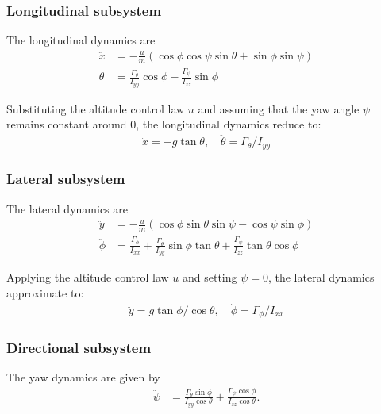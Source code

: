 \documentclass[conference]{IEEEtran}
\begin{document}
\subsubsection{Longitudinal subsystem}
The longitudinal dynamics are
%
\begin{align}
\ddot x &= -\frac{u}{m} \left( \cos \phi \cos \psi \sin \theta + \sin \phi \sin \psi \right) \label{long_dynamics_x} \\
\ddot \theta &= \frac{\Gamma_\theta} {I_{yy}} \cos \phi -\frac{\Gamma_\psi}{I_{zz}} \sin \phi \label{long_dynamics_theta}
\end{align}

Substituting the altitude control law $u$ and assuming that the yaw angle $\psi$ remains constant around 0, the longitudinal dynamics reduce to:
%
\begin{align} \label{red_long_dynamics_x}
\ddot x = -g \tan \theta ,\quad  
\ddot \theta =  {\Gamma_\theta}/{I_{yy}} 
\end{align}


\subsubsection{Lateral subsystem}
The lateral dynamics are
%
\begin{align}
\ddot y &= -\frac{u}{m} \left(\cos \phi \sin \theta \sin \psi - \cos \psi \sin \phi \right) \label{lat_dynamics_y}\\
\ddot \phi &=\frac{\Gamma_\phi}{I_{xx}} + \frac{\Gamma_\theta}{I_{yy}} \sin \phi \tan \theta  + \frac{\Gamma_\psi}{I_{zz}}  \tan \theta \cos \phi \label{lat_dynamics_phi}
\end{align}      


Applying the altitude control law $u$ and setting $\psi = 0$, the lateral dynamics approximate to:
\begin{align}\label{red_lat_dynamics_y}
\ddot y = g {\tan \phi}/{\cos \theta}, \quad
\ddot \phi = {\Gamma_\phi}/{I_{xx}}
\end{align}

\subsubsection{Directional subsystem}
The yaw dynamics are given by
\begin{equation}\label{dir_dynamics}
\begin{aligned}
\ddot \psi &= \frac{\Gamma_\theta \sin \phi}{I_{yy}\cos \theta}   +  \frac{\Gamma_\psi \cos \phi}{I_{zz}\cos \theta}. \end{aligned}
\end{equation}
\end{document}
